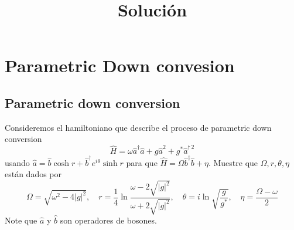 \chapter{Parametric Down convesion}

\section{Parametric down conversion}
Consideremos el hamiltoniano que describe el proceso de parametric down conversion
\begin{equation*}
  \hat{H} = \omega \hat{a}^{\dagger}\hat{a}  + g \hat{a}^{2} + g^{*} \hat{a}^{\dagger\,2}
\end{equation*}
usando $\hat{a} = \hat{b} \cosh{r} + \hat{b}^{\dagger} e^{i\theta} \sinh{r}$ para que $\hat{H} = \Omega \hat{b}^{\dagger}\hat{b} + \eta$. Muestre que $\Omega, r,\theta, \eta$ están dados por
\begin{equation*}
  \Omega = \sqrt{\omega^2 - 4|g|^2}, \quad r=\frac{1}{4}\ln{\frac{\omega - 2\sqrt{|g|^2}}{\omega + 2\sqrt{|g|^2}}}, \quad \theta = i\ln{\sqrt{\frac{g}{g^{*}}}}, \quad \eta = \frac{\Omega - \omega}{2}
\end{equation*}
Note que $\hat{a}$ y $\hat{b}$ son operadores de bosones.

\title{Solución}

